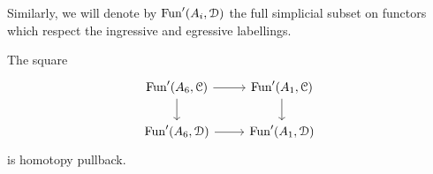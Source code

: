 \documentclass[main.tex]{subfiles}
\begin{document}
Similarly, we will denote by $\mathrm{Fun}'(A_{i}, \mathcal{D})$ the full simplicial subset on functors which respect the ingressive and egressive labellings.

\begin{lemma}
  \label{lemma:homotopy_pullback_for_filling_procedure}
  The square
  \begin{equation*}
    \begin{tikzcd}
      \Fun'(A_{6}, \category{C})
      \arrow[r]
      \arrow[d]
      & \Fun'(A_{1}, \category{C})
      \arrow[d]
      \\
      \Fun'(A_{6}, \category{D})
      \arrow[r]
      & \Fun'(A_{1}, \category{D})
    \end{tikzcd}
  \end{equation*}
  is homotopy pullback.
\end{lemma}
\end{document}
